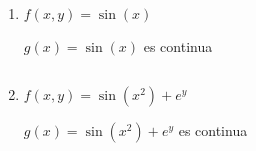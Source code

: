 \documentclass[../practica_03.tex]{subfiles}
\begin{document}
    \begin{enumerate}
        \item $f(x,y) = \sin(x)$

            $ g(x) = \sin(x) $ es continua 

            $ $

        \item $f(x,y) = \sin(x^2)+e^y$
        
            $ g(x) = \sin(x^2) + e^y $ es continua 
    \end{enumerate}
\end{document}
